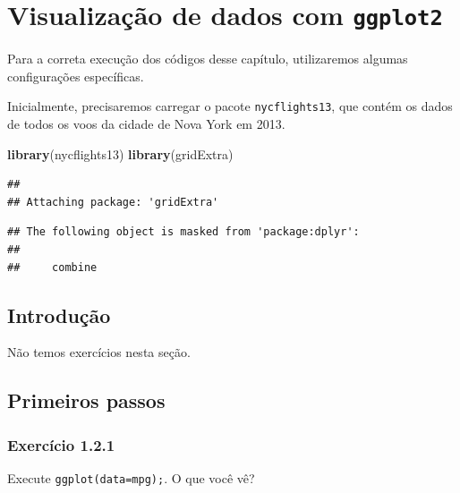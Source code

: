 \documentclass[
]{latex/krantz}
\newenvironment{Shaded}{\begin{snugshade}}{\end{snugshade}}
\newcommand{\FunctionTok}[1]{\textcolor[rgb]{0.13,0.29,0.53}{\textbf{#1}}}
\newcommand{\NormalTok}[1]{#1}
\theoremstyle{definition}
\theoremstyle{definition}
\theoremstyle{definition}
\theoremstyle{definition}
\theoremstyle{remark}
\begin{document}
\hypertarget{visualizauxe7uxe3o-de-dados-com-ggplot2}{%
\chapter{\texorpdfstring{Visualização de dados com \texttt{ggplot2}}{Visualização de dados com ggplot2}}\label{visualizauxe7uxe3o-de-dados-com-ggplot2}}

Para a correta execução dos códigos desse capítulo, utilizaremos algumas configurações específicas.

Inicialmente, precisaremos carregar o pacote \texttt{nycflights13}, que contém os dados de todos os voos da cidade de Nova York em 2013.

\begin{Shaded}
\begin{Highlighting}[]
\FunctionTok{library}\NormalTok{(nycflights13)}
\FunctionTok{library}\NormalTok{(gridExtra)}
\end{Highlighting}
\end{Shaded}

\begin{verbatim}
## 
## Attaching package: 'gridExtra'
\end{verbatim}

\begin{verbatim}
## The following object is masked from 'package:dplyr':
## 
##     combine
\end{verbatim}

\hypertarget{introduuxe7uxe3o}{%
\section{Introdução}\label{introduuxe7uxe3o}}

Não temos exercícios nesta seção.

\hypertarget{primeiros-passos}{%
\section{Primeiros passos}\label{primeiros-passos}}

\hypertarget{exr1-2-1}{%
\subsection*{Exercício 1.2.1}\label{exr1-2-1}}

Execute \texttt{ggplot(data=mpg);}. O que você vê?
\end{document}
